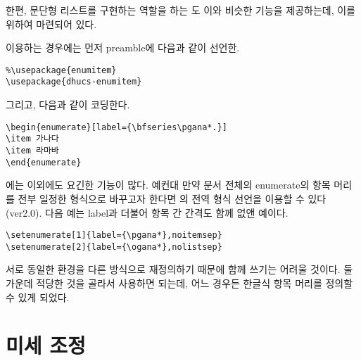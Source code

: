 한편, 문단형 리스트를 구현하는 역할을 하는 도
이와 비슷한 기능을 제공하는데, 이를
위하여 \가 마련되어 있다.

\을 이용하는 경우에는 먼저 preamble에 다음과 같이 선언한\다.
\begin{verbatim}
%\usepackage{enumitem}
\usepackage{dhucs-enumitem}
\end{verbatim}
그리고, 다음과 같이 코딩한다.
\begin{verbatim}
\begin{enumerate}[label={\bfseries\pgana*.}]
\item 가나다
\item 라마바
\end{enumerate}
\end{verbatim}

에는 이외에도 요긴한 기능이 많다. 예컨대
만약 문서 전체의 enumerate의 항목 머리를 전부 일정한 형식으로
바꾸고자 한다면 의 전역 형식 선언을 이용할 수
있다(ver2.0). 다음 예는 label과 더불어 항목 간 간격도 함께
없앤 예이다.
\begin{verbatim}
\setenumerate[1]{label={\pgana*},noitemsep}
\setenumerate[2]{label={\ogana*},nolistsep}
\end{verbatim}

\와 \는 서로 동일한 환경을
다른 방식으로 재정의하기 때문에 함께 쓰기는 어려울 것이다. 
둘 가운데 적당한 것을 골라서 사용하면 되는데, 어느 경우든
한글식 항목 머리를 정의할 수 있게 되었다.

\section{미세 조정}

